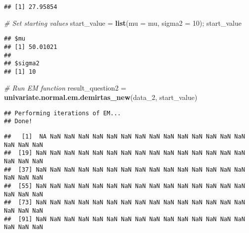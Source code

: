\documentclass[]{article}
\newenvironment{Shaded}{\begin{snugshade}}{\end{snugshade}}
\newcommand{\CommentTok}[1]{\textcolor[rgb]{0.56,0.35,0.01}{\textit{#1}}}
\newcommand{\DataTypeTok}[1]{\textcolor[rgb]{0.13,0.29,0.53}{#1}}
\newcommand{\DecValTok}[1]{\textcolor[rgb]{0.00,0.00,0.81}{#1}}
\newcommand{\KeywordTok}[1]{\textcolor[rgb]{0.13,0.29,0.53}{\textbf{#1}}}
\newcommand{\NormalTok}[1]{#1}
\newcommand{\OperatorTok}[1]{\textcolor[rgb]{0.81,0.36,0.00}{\textbf{#1}}}
\newcommand{\StringTok}[1]{\textcolor[rgb]{0.31,0.60,0.02}{#1}}
\begin{document}
\begin{verbatim}
## [1] 27.95854
\end{verbatim}

\begin{Shaded}
\begin{Highlighting}[]
\CommentTok{# Set starting values}
\NormalTok{start_value =}\StringTok{ }\KeywordTok{list}\NormalTok{(}\DataTypeTok{mu =}\NormalTok{ mu, }\DataTypeTok{sigma2 =} \DecValTok{10}\NormalTok{); start_value}
\end{Highlighting}
\end{Shaded}

\begin{verbatim}
## $mu
## [1] 50.01021
## 
## $sigma2
## [1] 10
\end{verbatim}

\begin{Shaded}
\begin{Highlighting}[]
\CommentTok{# Run EM function}
\NormalTok{result_question2 =}\StringTok{ }\KeywordTok{univariate.normal.em.demirtas_new}\NormalTok{(data_}\DecValTok{2}\NormalTok{, start_value)}
\end{Highlighting}
\end{Shaded}

\begin{verbatim}
## Performing iterations of EM... 
## Done!
\end{verbatim}

\begin{Shaded}
\end{Shaded}

\begin{verbatim}
##   [1]  NA NaN NaN NaN NaN NaN NaN NaN NaN NaN NaN NaN NaN NaN NaN NaN NaN NaN
##  [19] NaN NaN NaN NaN NaN NaN NaN NaN NaN NaN NaN NaN NaN NaN NaN NaN NaN NaN
##  [37] NaN NaN NaN NaN NaN NaN NaN NaN NaN NaN NaN NaN NaN NaN NaN NaN NaN NaN
##  [55] NaN NaN NaN NaN NaN NaN NaN NaN NaN NaN NaN NaN NaN NaN NaN NaN NaN NaN
##  [73] NaN NaN NaN NaN NaN NaN NaN NaN NaN NaN NaN NaN NaN NaN NaN NaN NaN NaN
##  [91] NaN NaN NaN NaN NaN NaN NaN NaN NaN NaN NaN NaN NaN NaN NaN NaN NaN NaN
\end{verbatim}
\end{document}
